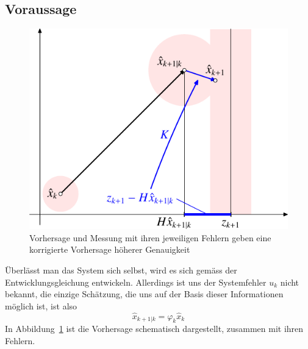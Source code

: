 \subsection{Voraussage}
\begin{figure}
\centering
\includegraphics{images/filter-2.pdf}
\caption{Vorhersage und Messung mit ihren jeweiligen Fehlern geben eine
korrigierte Vorhersage höherer Genauigkeit
\label{bild-vorhersage-korrektur}}
\end{figure}
Überlässt man das System sich selbst, wird es sich gemäss der
Entwicklungsgleichung entwickeln.
Allerdings ist uns der Systemfehler
$u_k$ nicht bekannt, die einzige Schätzung, die uns auf der Basis dieser
Informationen möglich ist, ist also
\[
\hat x_{k+1|k}=\varphi_k\hat x_k
\]
In Abbildung~\ref{bild-vorhersage-korrektur} ist die Vorhersage schematisch
dargestellt, zusammen mit ihren Fehlern.

